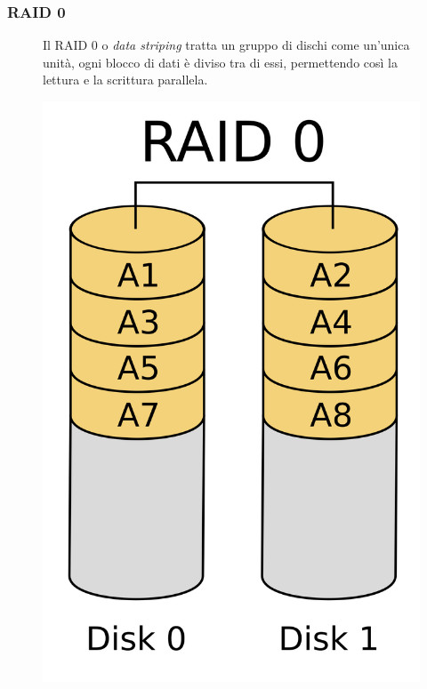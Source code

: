 \subsubsection*{RAID 0}
\begin{figure}[H]
    \centering
    \begin{minipage}{0.8\textwidth}
        Il RAID 0 o \textit{data striping} tratta un gruppo di dischi come un'unica unità, ogni blocco di dati è diviso tra di essi, permettendo così la lettura e la scrittura parallela.
    \end{minipage}
    \hfill
    \begin{minipage}{0.15\textwidth}
        \centering
        \includegraphics[width=1\linewidth]{assets/RAID_0.png}
    \end{minipage}
\end{figure}

